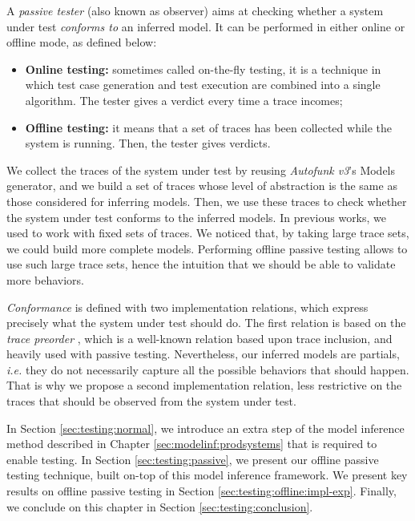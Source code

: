 A \textit{passive tester} (also known as observer) aims at
checking whether a system under test \emph{conforms to} an
inferred model. It can be performed in either online or offline
mode, as defined below:

\begin{itemize}
    \item \textbf{Online testing:} sometimes called on-the-fly
        testing, it is a technique in which test case generation
        and test execution are combined into a single algorithm.
        The tester gives a verdict every time a trace incomes;

    \item \textbf{Offline testing:} it means that a set of traces
        has been collected while the system is running. Then, the
        tester gives verdicts.
\end{itemize}

We collect the traces of the system under test by reusing
\textit{Autofunk v3}'s Models generator, and we build a set of
traces whose level of abstraction is the same as those considered
for inferring models. Then, we use these traces to check whether
the system under test conforms to the inferred models.  In
previous works, we used to work with fixed sets of traces. We
noticed that, by taking large trace sets, we could build more
complete models. Performing offline passive testing allows to use
such large trace sets, hence the intuition that we should be able
to validate more behaviors.

\emph{Conformance} is defined with two implementation relations,
which express precisely what the system under test should do. The
first relation is based on the \emph{trace preorder}
\cite{DNH84}, which is a well-known relation based upon trace
inclusion, and heavily used with passive testing.  Nevertheless,
our inferred models are partials, \emph{i.e.} they do not
necessarily capture all the possible behaviors that should
happen. That is why we propose a second implementation relation,
less restrictive on the traces that should be observed from the
system under test.

In Section \ref{sec:testing:normal}, we introduce an extra step
of the model inference method described in Chapter
\ref{sec:modelinf:prodsystems} that is required to enable
testing. In Section \ref{sec:testing:passive}, we present our
offline passive testing technique, built on-top of this model
inference framework. We present key results on offline passive
testing in Section \ref{sec:testing:offline:impl-exp}. Finally,
we conclude on this chapter in Section
\ref{sec:testing:conclusion}.

